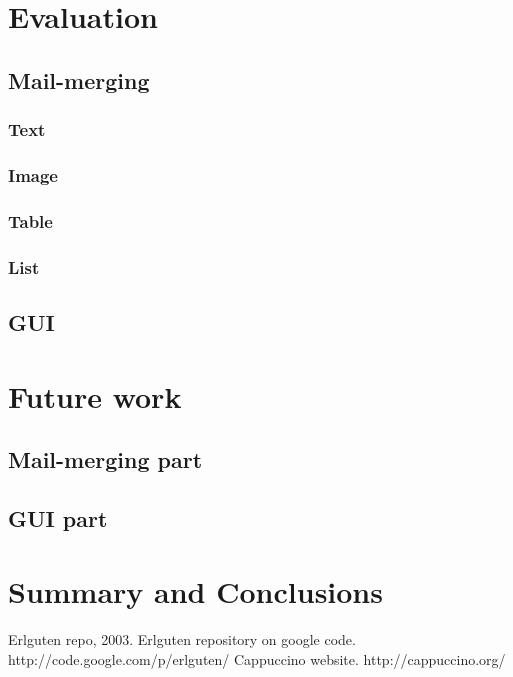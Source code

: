 \documentclass{report}
\begin{document}
\chapter{Evaluation}
\section{Mail-merging}
\subsection{Text}
\subsection{Image}
\subsection{Table}
\subsection{List}
\section{GUI}

\chapter{Future work}
\section{Mail-merging part}
\section{GUI part}

\chapter{Summary and Conclusions}

\begin{thebibliography}{9}
Erlguten repo, 2003. Erlguten repository on google code. http://code.google.com/p/erlguten/
 Cappuccino website. http://cappuccino.org/
\end{thebibliography}
\end{document}
